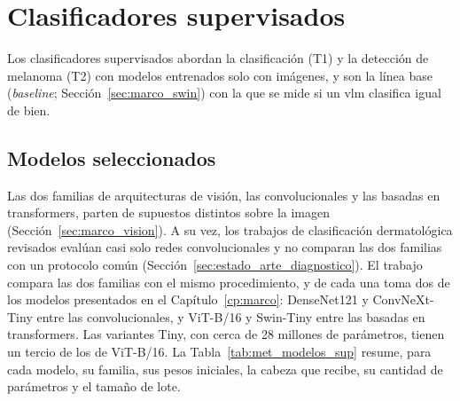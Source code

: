 \section{Clasificadores supervisados}
\label{sec:met_supervisados}

Los clasificadores supervisados abordan la clasificación (T1) y la detección de melanoma (T2) con modelos entrenados
solo con imágenes, y son la línea base (\emph{baseline}; Sección~\ref{sec:marco_swin}) con la que se mide si un \gls{vlm}
clasifica igual de bien.

\subsection{Modelos seleccionados}
\label{sec:met_supervisados_arquitecturas}

Las dos familias de arquitecturas de visión, las convolucionales y las basadas en transformers, parten de supuestos distintos sobre la imagen (Sección~\ref{sec:marco_vision}). A su vez, los trabajos de
clasificación dermatológica revisados evalúan casi solo redes convolucionales y no comparan las dos familias con un
protocolo común (Sección~\ref{sec:estado_arte_diagnostico}). El trabajo compara las dos familias con el mismo procedimiento, y de cada una toma dos de los modelos
presentados en el Capítulo~\ref{cp:marco}: DenseNet121 y ConvNeXt-Tiny entre las convolucionales, y ViT-B/16 y
Swin-Tiny entre las basadas en transformers. Las variantes Tiny, con cerca de 28 millones de parámetros, tienen un tercio de los de ViT-B/16. La Tabla~\ref{tab:met_modelos_sup} resume, para cada modelo, su familia, sus pesos
iniciales, la cabeza que recibe, su cantidad de parámetros y el tamaño de lote.



